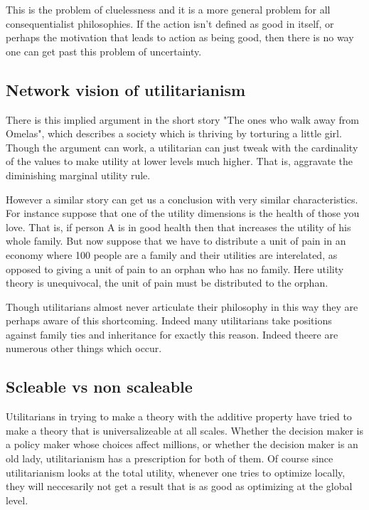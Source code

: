 \documentclass[12pt]{report}
\numberwithin{equation}{section}
\begin{document}
This is the problem of cluelessness\cite{Lenman2000} and it is a more general problem for all consequentialist philosophies. If the action isn't defined as good in itself, or perhaps the motivation that leads to action as being good, then there is no way one can get past this problem of uncertainty. 


\subsection{Network vision of utilitarianism}

There is this implied argument in the short story "The ones who walk away from Omelas", which describes a society which is thriving by torturing a little girl. Though the argument can work, a utilitarian can just tweak with the cardinality of the values to make utility at lower levels much higher. That is, aggravate the diminishing marginal utility rule. 

However a similar story can get us a conclusion with very similar characteristics. For instance suppose that one of the utility dimensions is the health of those you love. That is, if person A is in good health then that increases the utility of his whole family. But now suppose that we have to distribute a unit of pain in an economy where 100 people are a family and their utilities are interelated, as opposed to giving a unit of pain to an orphan who has no family. Here utility theory is unequivocal, the unit of pain must be distributed to the orphan. 

Though utilitarians almost never articulate their philosophy in this way they are perhaps aware of this shortcoming. Indeed many utilitarians take positions against family ties and inheritance for exactly this reason. Indeed theere are numerous other things which occur. 
 


\subsection{Scleable vs non scaleable}

Utilitarians in trying to make a theory with the additive property have tried to make a theory that is universalizeable at all scales. Whether the decision maker is a policy maker whose choices affect millions, or whether the decision maker is an old lady, utilitarianism has a prescription for both of them. Of course since utilitarianism looks at the total utility, whenever one tries to optimize locally, they will neccesarily not get a result that is as good as optimizing at the global level. 
\end{document}
